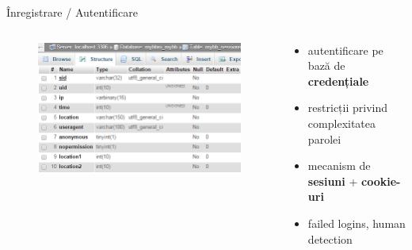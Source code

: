 \documentclass[9pt]{beamer}
\begin{document}
\begin{frame}{Înregistrare / Autentificare}
  \begin{columns}
    \begin{column}[c]{0.50\textwidth}
      \begin{figure}
        \includegraphics[scale=0.4]{figures/screen3}
      \end{figure}
    \end{column}
    \begin{column}[c]{0.50\textwidth}
        \begin{itemize}
		\vskip10pt
		\item autentificare pe bază de \textbf{credențiale}
		\vskip10pt
		\item restricții privind complexitatea parolei
		\vskip10pt
		\item mecanism de \textbf{sesiuni} + \textbf{cookie-uri}
		\vskip10pt
		\item failed logins, human detection
	    \end{itemize}
    \end{column}
  \end{columns}
\end{frame}
\end{document}
